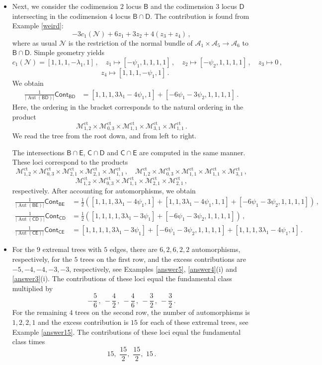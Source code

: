 \documentclass[11pt]{amsart}
\theoremstyle{definition}
\newcommand{\M}{\mathcal{M}}
\newcommand{\A}{\mathcal{A}}
\DeclareMathOperator{\ct}{ct}
\DeclareMathOperator{\Aut}{Aut}
\begin{document}
{\begin{itemize}
\item [(iv)] Next, we consider the codimension $2$ locus $\mathsf B$ and the codimension $3$ locus $\mathsf D$ intersecting in the codimension $4$ locus $\mathsf B\cap \mathsf D$. The contribution is found from Example \ref{weird}: 
$$-3c_1(\mathcal N)+6z_1+3z_2+4(z_3+z_4)\,,$$
where as usual  $\mathcal N$ is the restriction of the normal bundle of $\A_1\times \A_5\to \A_6$ to $\mathsf B\cap \mathsf D.$ 
Simple geometry yields $$c_1(\mathcal N)=[1, 1, 1, -\lambda_1, 1]\, , \quad z_1\mapsto [-\psi_1, 1, 1, 1,  1]\,,\quad z_2\mapsto [-\psi_2, 1, 1, 1, 1]\,,\quad z_3\mapsto 0\,,$$ $$\quad z_4\mapsto [1, 1, 1, -\psi_1, 1]\,.$$ 
We obtain 
\begin{align*}\frac{1}{|\Aut(\mathsf{BD})|}\mathsf{Cont}_{\mathsf{BD}}&=[1,1,1, 3\lambda_1-4\psi_1, 1]+[-6\psi_1-3\psi_2,1,1,1,1]\,.\end{align*} 
Here, the ordering in the bracket corresponds to the natural ordering in the product $$\M_{1, 2}^{\ct}\times \M_{0, 3}^{\ct}\times \M_{1, 1}^{\ct}\times \M_{3, 1}^{\ct}\times \M_{1,1}^{\ct}\, .$$ 
We read the tree from the root down, and from left to right.

The intersections $\mathsf B\cap \mathsf E$, $\mathsf C\cap \mathsf D$ and $\mathsf C\cap \mathsf E$ are computed in the same manner. These loci correspond to the products $$\M_{1, 2}^{\ct} \times \M_{0, 3}^{\ct}\times \M_{2, 1}^{\ct}\times \M_{2, 1}^{\ct}\times \M_{1,1}^{\ct}\,,\quad \M_{1, 2}^{\ct}\times \M_{0, 3}^{\ct}\times \M_{1, 1}^{\ct}\times \M_{1, 1}^{\ct}\times \M_{3,1}^{\ct}\,,$$ $$\M_{1, 2}^{\ct}\times \M_{0, 3}^{\ct}\times \M_{1, 1}^{\ct}\times \M_{2, 1}^{\ct}\times \M_{2,1}^{\ct}\,,$$ respectively. 
After accounting for automorphisms, we obtain 
\begin{align*}
\frac{1}{|\Aut(\mathsf{BE})|}\mathsf{Cont}_{\mathsf{BE}}&=\frac{1}{2}([1,1,1,3\lambda_1-4\psi_1,1]+[1,1, 3\lambda_1-4\psi_1, 1, 1]+[-6\psi_1-3\psi_2,1,1,1,1])\,,\\
\frac{1}{|\Aut(\mathsf{CD})|}\mathsf{Cont}_{\mathsf{CD}}&=\frac{1}{2}([1,1, 1, 1, 3\lambda_1-3\psi_1]+[-6\psi_1-3\psi_2,1,1,1,1])\,,\\
\frac{1}{|\Aut(\mathsf{CE})|}\mathsf{Cont}_{\mathsf{CE}}&=[1,1,1,1, 3\lambda_1-3\psi_1]+[-6\psi_1-3\psi_2,1,1,1,1]+[1,1,1,3\lambda_1-4\psi_1, 1]\,.
\end{align*}


    \item [(v)] For the $9$ extremal trees with $5$ edges, there are $6, 2, 6, 2, 2$ automorphisms, respectively, for the $5$ trees on the first row, and the excess contributions are $-5, -4, -4, -3, -3$, respectively, see Examples \ref{answer5}, \ref{answer4}(i) and \ref{answer3}(i). The contributions of these loci equal the fundamental class multiplied by $$-\frac{5}{6}\, ,\ -\frac{4}{2}\, ,\ -\frac{4}{6}\, ,\ -\frac{3}{2}\, ,\ -\frac{3}{2}\,.$$
    For the remaining $4$ trees on the second row, the number of automorphisms is $1, 2, 2, 1$ and the excess contribution is $15$ for each of these extremal trees, see Example \ref{answer15}. The contributions of these loci equal the fundamental class times $$15,\,\, \frac{15}{2},\,\, \frac{15}{2},\,\, 15\,.$$ 
\end{itemize}


}
\end{document}
